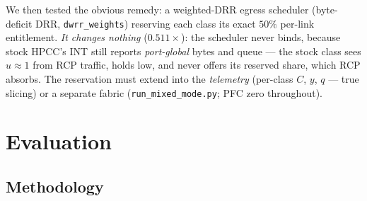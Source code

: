 \documentclass[sigconf, nonacm]{acmart}
\begin{document}
We then tested the obvious remedy: a weighted-DRR egress scheduler (byte-deficit DRR,
\texttt{dwrr\_weights}) reserving each class its exact $50\%$ per-link entitlement. \emph{It changes nothing} ($0.511\times$): the scheduler
never binds, because stock HPCC's INT still reports \emph{port-global} bytes and queue --- the
stock class sees $u \approx 1$ from RCP traffic, holds low, and never offers its reserved
share, which RCP absorbs. The reservation must extend into the \emph{telemetry} (per-class
$C$, $y$, $q$ --- true slicing) or a separate fabric (\texttt{run\_mixed\_mode.py}; PFC
zero throughout).

\section{Evaluation}
\label{sec:eval}

\subsection{Methodology}
\end{document}

